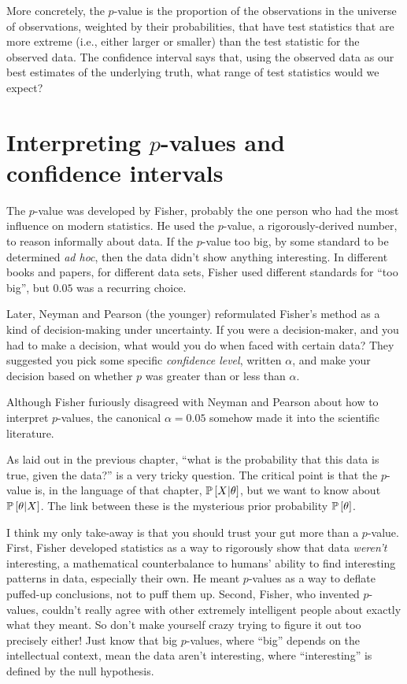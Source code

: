 More concretely, the $p$-value is the proportion of the observations in the universe of observations, weighted by their probabilities, that have test statistics that are more extreme (i.e., either larger or smaller) than the test statistic for the observed data. The confidence interval says that, using the observed data as our best estimates of the underlying truth, what range of test statistics would we expect?

\section{Interpreting $p$-values and confidence intervals}

The $p$-value was developed by Fisher, probably the one person who had the most influence on modern statistics. He used the $p$-value, a rigorously-derived number, to reason informally about data. If the $p$-value too big, by some standard to be determined \textit{ad hoc}, then the data didn't show anything interesting. In different books and papers, for different data sets, Fisher used different standards for ``too big'', but $0.05$ was a recurring choice.

Later, Neyman and Pearson (the younger) reformulated Fisher's method as a kind
of decision-making under uncertainty. If you were a decision-maker, and you had
to make a decision, what would you do when faced with certain data? They
suggested you pick some specific \emph{confidence level}, written $\alpha$, and
make your decision based on whether $p$ was greater than or less than $\alpha$.

Although Fisher furiously disagreed with Neyman and Pearson about how to interpret $p$-values, the canonical $\alpha = 0.05$ somehow made it into the scientific literature.

As laid out in the previous chapter, ``what is the probability that this data is true, given the data?'' is a very tricky question. The critical point is that the $p$-value is, in the language of that chapter, $\mathbb{P}\left[{X | \theta}\right]$, but we want to know about $\mathbb{P}\left[{\theta | X}\right]$. The link between these is the mysterious prior probability $\mathbb{P}\left[{\theta}\right]$.

I think my only take-away is that you should trust your gut more than a $p$-value. First, Fisher developed statistics as a way to rigorously show that data \emph{weren't} interesting, a mathematical counterbalance to humans' ability to find interesting patterns in data, especially their own. He meant $p$-values as a way to deflate puffed-up conclusions, not to puff them up. Second, Fisher, who invented $p$-values, couldn't really agree with other extremely intelligent people about exactly what they meant. So don't make yourself crazy trying to figure it out too precisely either! Just know that big $p$-values, where ``big'' depends on the intellectual context, mean the data aren't interesting, where ``interesting'' is defined by the null hypothesis.

